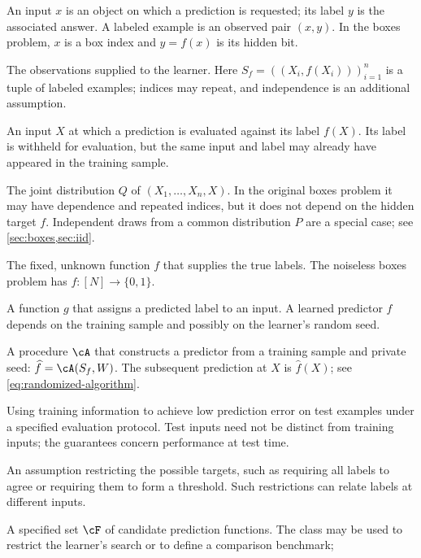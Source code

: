 \documentclass[11pt,twoside]{article}
\theoremstyle{definition}
\theoremstyle{remark}
\begin{document}
\begin{description}[style=nextline,leftmargin=1.5em,labelindent=0pt]
\item[Input; label; labeled example]
An input $x$ is an object on which a prediction is requested; its label $y$
is the associated answer. A labeled example is an observed pair $(x,y)$.
In the boxes problem, $x$ is a box index and $y=f(x)$ is its hidden bit.
\item[Training sample]
The observations supplied to the learner. Here
$S_f=((X_i,f(X_i)))_{i=1}^n$ is a tuple of labeled examples; indices may
repeat, and independence is an additional assumption.
\item[Test input]
An input $X$ at which a prediction is evaluated against its label $f(X)$.
Its label is withheld for evaluation, but the same input and label may
already have appeared in the training sample.
\item[Sampling law]
The joint distribution $Q$ of $(X_1,\ldots,X_n,X)$. In the original boxes
problem it may have dependence and repeated indices, but it does not depend
on the hidden target $f$. Independent draws from a common distribution $P$
are a special case; see \cref{sec:boxes,sec:iid}.
\item[Target]
The fixed, unknown function $f$ that supplies the true labels. The noiseless
boxes problem has $f:[N]\to\{0,1\}$.
\item[Predictor]
A function $g$ that assigns a predicted label to an input. A learned
predictor $\widehat f$ depends on the training sample and possibly on
the learner's random seed.
\item[Learner]
A procedure $\cA$ that constructs a predictor from a training sample and
private seed: $\widehat f=\cA(S_f,W)$. The subsequent prediction at $X$
is $\widehat f(X)$; see \cref{eq:randomized-algorithm}.
\item[Generalization]
Using training information to achieve low prediction error on test examples
under a specified evaluation protocol. Test inputs need not be distinct
from training inputs; the guarantees concern performance at test time.
\item[Structural promise]
An assumption restricting the possible targets, such as requiring all labels
to agree or requiring them to form a threshold. Such restrictions can relate
labels at different inputs.
\item[Hypothesis class]
A specified set $\cF$ of candidate prediction functions. The class may be
used to restrict the learner's search or to define a comparison benchmark;

\end{description}
\end{document}

